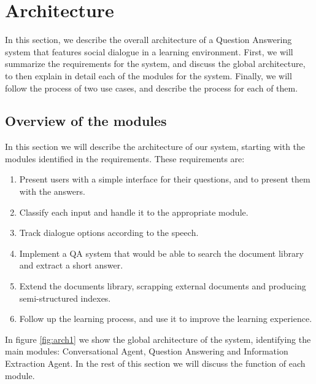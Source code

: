 \chapter{Architecture}
\label{chap:architecture}

\begin{chapterintro}

In this section, we describe the overall architecture of a Question Answering system that features social dialogue in a learning environment. First, we will summarize the requirements for the system, and discuss the global architecture, to then explain in detail each of the modules for the system. Finally, we will follow the process of two use cases, and describe the process for each of them.
 
\end{chapterintro}

\cleardoublepage

\section{Overview of the modules}

In this section we will describe the architecture of our system, starting with the modules identified in the requirements. These requirements are:
\begin{enumerate}[label=(\roman*)]
 \item Present users with a simple interface for their questions, and to present them with the answers.
 \item Classify each input  and handle it to the appropriate module.
 \item Track dialogue options according to the speech.
 \item Implement a \ac{QA} system that would be able to search the document library and extract a short answer.
 \item Extend the documents library, scrapping external documents and producing semi-structured indexes.
 \item Follow up the learning process, and use it to improve the learning experience. 
\end{enumerate}

In figure \ref{fig:arch1} we show the global architecture of the system, identifying the main modules: Conversational Agent, Question Answering and Information Extraction Agent. In the rest of this section we will discuss the function of each module.

